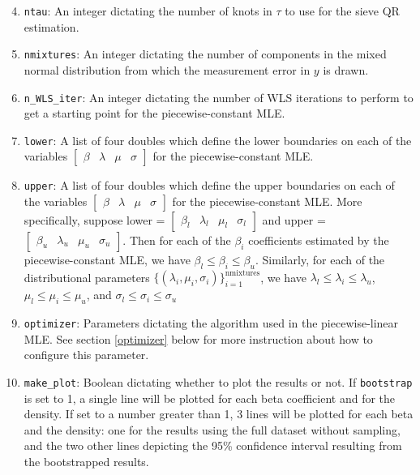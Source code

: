 \documentclass[12pt]{article}
\begin{document}
\begin{enumerate}
    \setcounter{enumi}{3}
    \item \lstinline{ntau}: An integer dictating the number of knots in $\tau$ to use for the sieve QR estimation.
    \item \lstinline{nmixtures}: An integer dictating the number of components in the mixed normal distribution from which the measurement error in $y$ is drawn.
    \item \lstinline{n_WLS_iter}: An integer dictating the number of WLS iterations to perform to get a starting point for the piecewise-constant MLE.
    \item \lstinline{lower}: A list of four doubles which define the lower boundaries on each of the variables $\begin{bmatrix} \beta & \lambda & \mu & \sigma \end{bmatrix}$ for the piecewise-constant MLE.
    \item \lstinline{upper}: A list of four doubles which define the upper boundaries on each of the variables $\begin{bmatrix} \beta & \lambda & \mu & \sigma \end{bmatrix}$ for the piecewise-constant MLE. More specifically, suppose lower = $\begin{bmatrix} \beta_l & \lambda_l & \mu_l & \sigma_l \end{bmatrix}$ and upper = $\begin{bmatrix} \beta_u & \lambda_u & \mu_u & \sigma_u \end{bmatrix}$. Then for each of the $\beta_i$ coefficients estimated by the piecewise-constant MLE, we have $\beta_l \leq \beta_i \leq \beta_u$. Similarly, for each of the distributional parameters $\{(\lambda_i, \mu_i, \sigma_i) \}_{i=1}^{\text{nmixtures}}$, we have $\lambda_l \leq \lambda_i \leq \lambda_u$, $\mu_l \leq \mu_i \leq \mu_u$, and $\sigma_l \leq \sigma_i \leq \sigma_u$
    \item \lstinline{optimizer}: Parameters dictating the algorithm used in the piecewise-linear MLE. See section \ref{optimizer} below for more instruction about how to configure this parameter.
    \item \lstinline{make_plot}: Boolean dictating whether to plot the results or not. If \lstinline{bootstrap} is set to 1, a single line will be plotted for each beta coefficient and for the density. If set to a number greater than 1, 3 lines will be plotted for each beta and the density: one for the results using the full dataset without sampling, and the two other lines depicting the 95\% confidence interval resulting from the bootstrapped results.
\end{enumerate}
\end{document}

